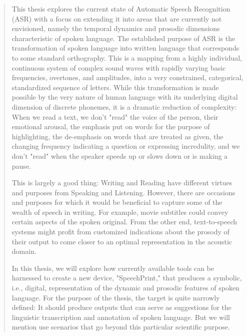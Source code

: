 
\begin{abstract}

This thesis explores the current state of Automatic Speech Recognition (ASR) with a focus on extending it into areas that are currently not envisioned, namely the temporal dynamics and prosodic dimensions characteristic of spoken language. The established purpose of ASR is the transformation of spoken language into written language that corresponds to some standard orthography. This is a mapping from a highly individual, continuous system of complex sound waves with rapidly varying basic frequencies, overtones, and amplitudes, into a very constrained, categorical, standardized sequence of letters. While this transformation is made possible by the very nature of human language with its underlying digital dimension of discrete phonemes, it is a dramatic reduction of complexity: When we read a text, we don't "read" the voice of the person, their emotional arousal, the emphasis put on words for the purpose of highlighting, the de-emphasis on words that are treated as given, the changing frequency indicating a question or expressing incredulity, and we don't "read" when the speaker speeds up or slows down or is making a pause.

This is largely a good thing: Writing and Reading have different virtues and purposes from Speaking and Listening. However, there are occasions and purposes for which it would be beneficial to capture some of the wealth of speech in writing. For example, movie subtitles could convey certain aspects of the spoken original. From the other end, text-to-speech systems might profit from customized indications about the prosody of their output to come closer to an optimal representation in the acoustic domain. 

In this thesis, we will explore how currently available tools can be harnessed to create a new device, "SpeechPrint," that produces a symbolic, i.e., digital, representation of the dynamic and prosodic features of spoken language. For the purpose of the thesis, the target is quite narrowly defined: It should produce outputs that can serve as suggestions for the linguistic transcription and annotation of spoken language. But we will mention use scenarios that go beyond this particular scientific purpose. 


\end{abstract}
